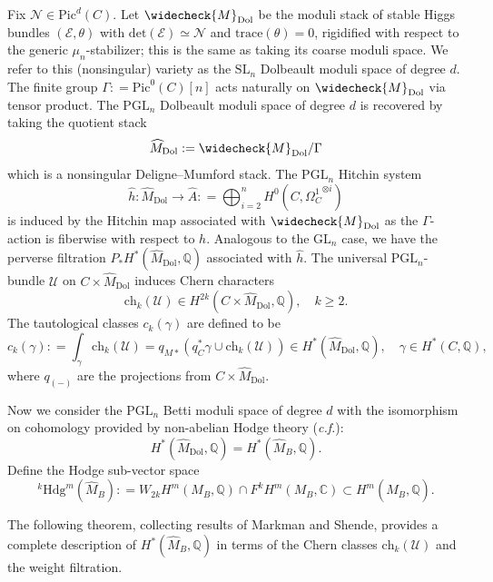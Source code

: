 \documentclass[11pt]{amsart}
\theoremstyle{plain}
\theoremstyle{definition}
\theoremstyle{remark}
\newcommand{\BC}{{\mathbb{C}}}
\newcommand{\BQ}{{\mathbb{Q}}}
\newcommand{\CE}{{\mathcal E}}
\newcommand{\CN}{{\mathcal N}}
\newcommand{\CU}{{\mathcal U}}
\begin{document}
Fix $\CN \in \mathrm{Pic}^d(C)$. Let $\widecheck{M}_{\mathrm{Dol}}$ be 
the moduli stack of stable Higgs bundles $(\CE, \theta)$ with $\mathrm{det}(\CE) \simeq \CN$ and $\mathrm{trace}(\theta) = 0$, rigidified with respect to the generic $\mu_n$-stabilizer; this is the same as taking its coarse moduli space.  We refer to this (nonsingular) variety as the $\mathrm{SL}_n$ Dolbeault moduli space of degree $d$. The finite group $\Gamma: = \mathrm{Pic}^0(C)[n]$ acts naturally on $\widecheck{M}_{\mathrm{Dol}}$ via tensor product. The $\mathrm{PGL}_n$ Dolbeault moduli space of degree $d$ is recovered by taking the quotient stack
\begin{equation}\label{233}
\widehat{M}_{\mathrm{Dol}} : = \widecheck{M}_{\mathrm{Dol}}/\Gamma
\end{equation}
which is a nonsingular Deligne--Mumford stack. The $\mathrm{PGL}_n$ Hitchin system 
\[
\widehat{h}: \widehat{M}_{\mathrm{Dol}} \to \widehat{A}: = \bigoplus_{i=2}^n H^0(C, {\Omega_C^1}^{\otimes i})
\]
is induced by the Hitchin map associated with $\widecheck{M}_{\mathrm{Dol}}$ as the $\Gamma$-action is fiberwise with respect to $h$. Analogous to the $\mathrm{GL}_n$  case, we have the perverse filtration $P_*H^*(\widehat{M}_{\mathrm{Dol}}, \BQ)$ associated with $\widehat{h}$. The universal $\mathrm{PGL}_n$-bundle $\CU$ on $C \times \widehat{M}_{\mathrm{Dol}}$ induces Chern characters
\[
\mathrm{ch}_k(\CU) \in H^{2k}(C \times \widehat{M}_{\mathrm{Dol}}, \BQ),\quad k \geq 2. 
\]
The tautological classes $c_k(\gamma)$ are defined to be
\[
c_k(\gamma): = \int_\gamma \mathrm{ch}_k(\CU) = q_{M*}(q_C^*\gamma \cup \mathrm{ch}_k(\CU)) \in H^*(\widehat{M}_{\mathrm{Dol}}, \BQ), \quad \gamma \in H^*(C,\BQ),
\]
where $q_{(-)}$ are the projections from $C \times \widehat{M}_{\mathrm{Dol}}$.

Now we consider the $\mathrm{PGL}_n$ Betti moduli space of degree $d$ with the isomorphism on cohomology provided by non-abelian Hodge theory (\emph{c.f.}\cite[Theorem 1.2.4]{dCHM1}):
\begin{equation}\label{NAH2}
H^*(\widehat{M}_{\mathrm{Dol}}, \BQ) = H^*(\widehat{M}_{B}, \BQ).
\end{equation}
Define the Hodge sub-vector space
\[
^k\mathrm{Hdg}^m(\widehat{M}_B): = W_{2k}H^m(M_B, \BQ) \cap F^kH^m(M_B, \BC) \subset H^m(\widehat{M}_{B}, \BQ).
\]

The following theorem, collecting results of Markman and Shende, provides a complete description of $H^*(\widehat{M}_B, \BQ)$ in terms of the Chern classes $\mathrm{ch}_k(\CU)$ and the weight filtration.
\end{document}
